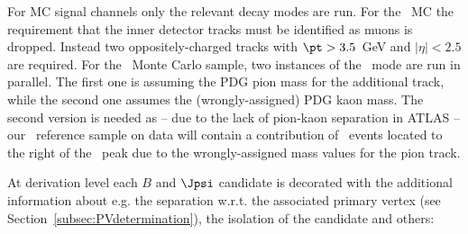 For MC signal channels only the relevant decay modes are run.  For
the \Bhh\ MC the requirement that the inner detector tracks must be
identified as muons is dropped. Instead two oppositely-charged tracks
with $\pt > 3.5$~GeV and $|\eta| < 2.5$ are required.
For the \BpPipJpsi\ Monte Carlo sample, two instances of the
\BpmKpmJpsi\ mode are run in parallel.  The first one is assuming the
PDG pion mass for the additional track, while the second one assumes
the (wrongly-assigned) PDG kaon mass.  The second version is needed as
-- due to the lack of pion-kaon separation in ATLAS -- 
our \BpmKpmJpsi\ reference sample on data will contain a contribution
of \BpPipJpsi\ events located to the right of the \Bpm\ peak 
due to the wrongly-assigned mass values for the pion track.

At derivation level each $B$ and $\Jpsi$ candidate is decorated with
the additional information about e.g. the separation w.r.t. the associated 
primary vertex (see Section~\ref{subsec:PVdetermination}), 
the isolation of the candidate and others:
